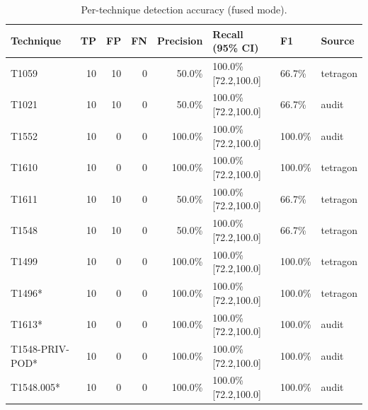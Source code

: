 \begin{table}[t]
\centering
\caption{Per-technique detection accuracy (fused mode).}
\label{tab:detection-accuracy}
\begin{tabular}{lrrrrlll}
\toprule
Technique & TP & FP & FN & Precision & Recall (95\% CI) & F1 & Source \\
\midrule
T1059 & 10 & 10 & 0 & 50.0\% & 100.0\% [72.2,100.0] & 66.7\% & tetragon \\
T1021 & 10 & 10 & 0 & 50.0\% & 100.0\% [72.2,100.0] & 66.7\% & audit \\
T1552 & 10 & 0 & 0 & 100.0\% & 100.0\% [72.2,100.0] & 100.0\% & audit \\
T1610 & 10 & 0 & 0 & 100.0\% & 100.0\% [72.2,100.0] & 100.0\% & tetragon \\
T1611 & 10 & 10 & 0 & 50.0\% & 100.0\% [72.2,100.0] & 66.7\% & tetragon \\
T1548 & 10 & 10 & 0 & 50.0\% & 100.0\% [72.2,100.0] & 66.7\% & tetragon \\
T1499 & 10 & 0 & 0 & 100.0\% & 100.0\% [72.2,100.0] & 100.0\% & tetragon \\
T1496* & 10 & 0 & 0 & 100.0\% & 100.0\% [72.2,100.0] & 100.0\% & tetragon \\
T1613* & 10 & 0 & 0 & 100.0\% & 100.0\% [72.2,100.0] & 100.0\% & audit \\
T1548-PRIV-POD* & 10 & 0 & 0 & 100.0\% & 100.0\% [72.2,100.0] & 100.0\% & audit \\
T1548.005* & 10 & 0 & 0 & 100.0\% & 100.0\% [72.2,100.0] & 100.0\% & audit \\
\bottomrule
\end{tabular}
\end{table}
